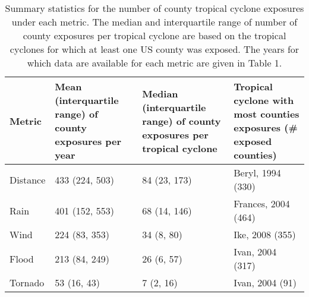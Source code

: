 \begin{table}[ht]
\centering
\caption{Summary statistics for the number of county tropical cyclone exposures under each metric.     
	 The median and interquartile range of number of county exposures per tropical cyclone are based on
         the tropical cyclones for which at least one US county was exposed. The years for which
         data are available for each metric are given in Table 1.} 
\label{tab:exposuresummaries}
\begin{tabular}{p{1.75cm}p{3cm}p{4cm}p{4cm}}
  \toprule
Metric & Mean (interquartile range) of county exposures per year & Median (interquartile range) of county exposures per tropical cyclone & Tropical cyclone with most counties exposures (\# exposed counties) \\ 
  \midrule
Distance & 433 (224, 503) & 84 (23, 173) & Beryl, 1994 (330) \\ 
  Rain & 401 (152, 553) & 68 (14, 146) & Frances, 2004 (464) \\ 
  Wind & 224 (83, 353) & 34 (8, 80) & Ike, 2008 (355) \\ 
  Flood & 213 (84, 249) & 26 (6, 57) & Ivan, 2004 (317) \\ 
  Tornado & 53 (16, 43) & 7 (2, 16) & Ivan, 2004 (91) \\ 
   \bottomrule
\end{tabular}
\end{table}

